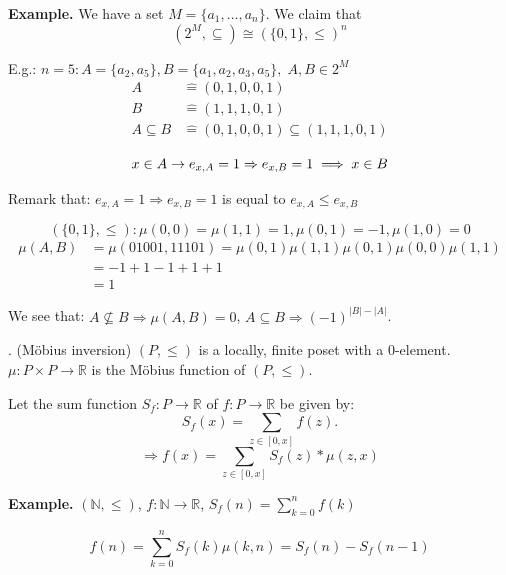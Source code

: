 \textbf{Example.}
We have a set $M = \{a_1, \ldots , a_n\}$. We claim that
\[
  (2^M, \subseteq) \cong ( \{0,1\}, \leq)^n
\]

E.g.: $n = 5: A = \{a_2,a_5\}, B= \{a_1, a_2, a_3, a_5\},\; A, B \in 2^M$
\begin{align*}
  A &\hat{=} (0,1,0,0,1) \\
  B &\hat{=} (1,1,1,0,1) \\
  A \subseteq B &\hat{=} (0,1,0,0,1) \subseteq (1,1,1,0,1) \\
\end{align*}
\[
  x \in A \rightarrow e_{x,A} = 1 \Rightarrow  e_{x,B} = 1 \implies x \in B\\
\]

Remark that: $e_{x,A} = 1 \Rightarrow e_{x,B} = 1$ is equal to $e_{x,A} \leq e_{x,B}$

\[
    ( \{0,1\}, \leq): \mu(0,0) = \mu(1,1) = 1, \mu(0,1) = -1, \mu(1,0) = 0
\]
\begin{align*}
    \mu(A,B) &= \mu(01001, 11101) = \mu(0,1) \mu(1,1) \mu(0,1) \mu(0,0) \mu(1,1) \\
    &= -1 +1 -1 +1 +1 \\
    &= 1
\end{align*}

We see that:
$A\not\subseteq B \Rightarrow \mu(A,B) = 0$,
$A\subseteq B \Rightarrow (-1)^{|B| - |A|}$.

\Theorem.
(Möbius inversion)
$(P, \leq)$ is a locally, finite poset with a 0-element.
$\mu: P \times P \rightarrow \mathbb{R}$ is the Möbius function of $(P, \leq)$.

Let the sum function $S_f: P \rightarrow \mathbb{R}$ of $f: P \rightarrow \mathbb{R}$ be given by:
\[
  S_f(x) = \sum_{z \in [0,x]} f(z).
\]
\[
 \Rightarrow f(x) = \sum_{z \in [0,x]} S_f(z) * \mu(z,x)
\]

\textbf{Example.}
$(\mathbb{N}, \leq)$, $f: \mathbb{N} \rightarrow \mathbb{R}$, $S_f(n) = \displaystyle{\sum_{k=0}^{n} f(k)}$

\[
  f(n) = \sum_{k=0}^{n} S_f(k) \mu(k,n) = S_f(n) - S_f(n-1)
\]

